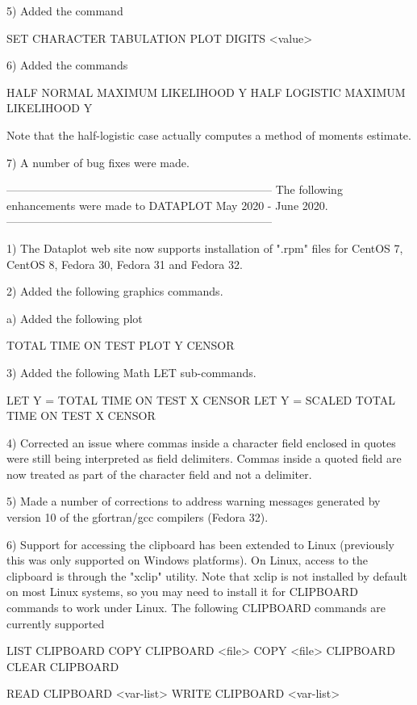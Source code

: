   5) Added the command

         SET CHARACTER TABULATION PLOT DIGITS <value>

  6) Added the commands

         HALF NORMAL MAXIMUM LIKELIHOOD Y
         HALF LOGISTIC MAXIMUM LIKELIHOOD Y

     Note that the half-logistic case actually computes a method
     of moments estimate.

  7) A number of bug fixes were made.

-----------------------------------------------------------------------
The following enhancements were made to DATAPLOT
May 2020 - June 2020.
-----------------------------------------------------------------------

 1) The Dataplot web site now supports installation of ".rpm" files
    for CentOS 7, CentOS 8, Fedora 30, Fedora 31 and Fedora 32.

 2) Added the following graphics commands.

    a) Added the following plot

          TOTAL TIME ON TEST PLOT Y CENSOR

 3) Added the following Math LET sub-commands.

      LET Y = TOTAL TIME ON TEST        X CENSOR
      LET Y = SCALED TOTAL TIME ON TEST X CENSOR

 4) Corrected an issue where commas inside a character field enclosed
    in quotes were still being interpreted as field delimiters.  Commas
    inside a quoted field are now treated as part of the character
    field and not a delimiter.

 5) Made a number of corrections to address warning messages generated
    by version 10 of the gfortran/gcc compilers (Fedora 32).

 6) Support for accessing the clipboard has been extended to Linux
    (previously this was only supported on Windows platforms).  On
    Linux, access to the clipboard is through the "xclip" utility.
    Note that xclip is not installed by default on most Linux systems,
    so you may need to install it for CLIPBOARD commands to work under
    Linux.  The following CLIPBOARD commands are currently supported

         LIST CLIPBOARD
         COPY CLIPBOARD <file>
         COPY <file> CLIPBOARD
         CLEAR CLIPBOARD

         READ CLIPBOARD  <var-list>
         WRITE CLIPBOARD <var-list>

